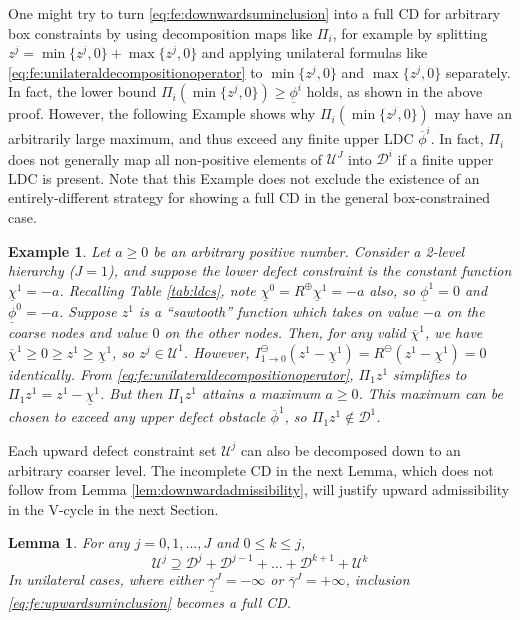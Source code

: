 \documentclass[letterpaper,final,12pt,reqno]{amsart}
\theoremstyle{cstyle}
\newtheorem{lemma}[theorem]{Lemma}
\theoremstyle{cstyle*}
\theoremstyle{dstyle}
\newtheorem{example}[theorem]{Example}
\numberwithin{equation}{section}
\numberwithin{figure}{section}
\numberwithin{table}{section}
\numberwithin{theorem}{section}
\newcommand{\maxR}{R^{\bm{\oplus}}}
\newcommand{\minR}{R^{\bm{\ominus}}}
\begin{document}
One might try to turn \eqref{eq:fe:downwardsuminclusion} into a full CD for arbitrary box constraints by using decomposition maps like $\Pi_i$, for example by splitting $z^j = \min\{z^j,0\} + \max\{z^j,0\}$ and applying unilateral formulas like \eqref{eq:fe:unilateraldecompositionoperator} to $\min\{z^j,0\}$ and $\max\{z^j,0\}$ separately.  In fact, the lower bound $\Pi_i (\min\{z^j,0\}) \ge \underline{\phi}^i$ holds, as shown in the above proof.  However, the following Example shows why $\Pi_i(\min\{z^j,0\})$ may have an arbitrarily large maximum, and thus exceed any finite upper LDC $\overline{\phi}^i$.  In fact, $\Pi_i$ does not generally map all non-positive elements of $\mathcal{U}^J$ into $\mathcal{D}^i$ if a finite upper LDC is present.  Note that this Example does not exclude the existence of an entirely-different strategy for showing a full CD in the general box-constrained case.

\begin{example}  \label{ex:notfullcd}
Let $a\ge 0$ be an arbitrary positive number.  Consider a 2-level hierarchy ($J=1$), and suppose the lower defect constraint is the constant function $\underline{\chi}^1=-a$.  Recalling Table \ref{tab:ldcs}, note $\underline{\chi}^0=\maxR \underline{\chi}^1=-a$ also, so $\underline{\phi}^1=0$ and $\underline{\phi}^0=-a$.  Suppose $z^1$ is a ``sawtooth'' function which takes on value $-a$ on the coarse nodes and value $0$ on the other nodes.  Then, for any valid $\overline{\chi}^1$, we have $\overline{\chi}^1 \ge 0 \ge z^1\ge \underline{\chi}^1$, so $z^j \in \mathcal{U}^1$.  However, $I_{1\to 0}^\ominus(z^1 - \underline{\chi}^1) = \minR(z^1 - \underline{\chi}^1) = 0$ identically.  From \eqref{eq:fe:unilateraldecompositionoperator}, $\Pi_1 z^1$ simplifies to $\Pi_1 z^1 = z^1 - \underline{\chi}^1$.  But then $\Pi_1 z^1$ attains a maximum $a\ge 0$.  This maximum can be chosen to exceed any upper defect obstacle $\overline{\phi}^1$, so $\Pi_1 z^1 \notin \mathcal{D}^1$.
\end{example}

Each upward defect constraint set $\mathcal{U}^j$ can also be decomposed down to an arbitrary coarser level.  The incomplete CD in the next Lemma, which does not follow from Lemma \ref{lem:downwardadmissibility}, will justify upward admissibility in the V-cycle in the next Section.

\begin{lemma}  \label{lem:upwardadmissibility}  For any $j=0,1,\dots,J$ and $0\le k\le j$,
\begin{equation}
\mathcal{U}^j \supseteq \mathcal{D}^j + \mathcal{D}^{j-1} + \dots + \mathcal{D}^{k+1} + \mathcal{U}^k \label{eq:fe:upwardsuminclusion}
\end{equation}
In unilateral cases, where either $\underline{\gamma}^J=-\infty$ or $\overline{\gamma}^J=+\infty$, inclusion \eqref{eq:fe:upwardsuminclusion} becomes a full CD. \end{lemma}
\end{document}
